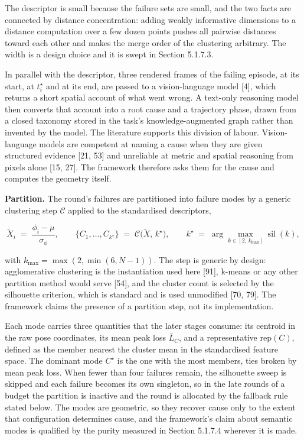 \documentclass[
  11pt,
]{article}
\begin{document}
The descriptor is small because the failure sets are small, and the two
facts are connected by distance concentration: adding weakly informative
dimensions to a distance computation over a few dozen points pushes all
pairwise distances toward each other and makes the merge order of the
clustering arbitrary. The width is a design choice and it is swept in
Section 5.1.7.3.

In parallel with the descriptor, three rendered frames of the failing
episode, at its start, at \(t^\star_i\) and at its end, are passed to a
vision-language model {[}4{]}, which returns a short spatial account of
what went wrong. A text-only reasoning model then converts that account
into a root cause and a trajectory phase, drawn from a closed taxonomy
stored in the task's knowledge-augmented graph rather than invented by
the model. The literature supports this division of labour.
Vision-language models are competent at naming a cause when they are
given structured evidence {[}21, 53{]} and unreliable at metric and
spatial reasoning from pixels alone {[}15, 27{]}. The framework
therefore asks them for the cause and computes the geometry itself.

\textbf{Partition.} The round's failures are partitioned into failure
modes by a generic clustering step \(\mathcal{C}\) applied to the
standardised descriptors,

\[\tilde{X}_i \;=\; \frac{\phi_i - \mu}{\sigma_\phi}, \qquad \{C_1,\dots,C_{k^\star}\} \;=\; \mathcal{C}\big(\tilde{X},\, k^\star\big), \qquad k^\star \;=\; \arg\max_{k \in [2,\,k_{\max}]} \operatorname{sil}(k), \tag{7}\]

with \(k_{\max} = \max(2, \min(6, N-1))\). The step is generic by
design: agglomerative clustering is the instantiation used here
{[}91{]}, k-means or any other partition method would serve {[}54{]},
and the cluster count is selected by the silhouette criterion, which is
standard and is used unmodified {[}70, 79{]}. The framework claims the
presence of a partition step, not its implementation.

Each mode carries three quantities that the later stages consume: its
centroid in the raw pose coordinates, its mean peak loss \(\bar{L}_C\),
and a representative \(\mathrm{rep}(C)\), defined as the member nearest
the cluster mean in the standardised feature space. The dominant mode
\(C^\star\) is the one with the most members, ties broken by mean peak
loss. When fewer than four failures remain, the silhouette sweep is
skipped and each failure becomes its own singleton, so in the late
rounds of a budget the partition is inactive and the round is allocated
by the fallback rule stated below. The modes are geometric, so they
recover cause only to the extent that configuration determines cause,
and the framework's claim about semantic modes is qualified by the
purity measured in Section 5.1.7.4 wherever it is made.
\end{document}
